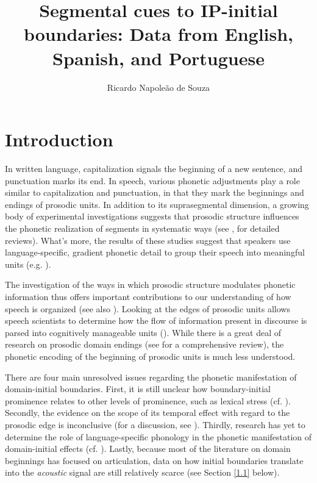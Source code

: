 \documentclass[output=paper]{langscibook}
\author{Ricardo {Napoleão de Souza}\orcid{0000-0003-2541-8326}\affiliation{University of Edinburgh}}
\title[Segmental cues to IP-initial boundaries]
{Segmental cues to IP-initial boundaries: Data from English, Spanish, and Portuguese}
\begin{document}
\maketitle

\section{Introduction}\label{Intro}
In written language, capitalization signals the beginning of a new sentence, and punctuation marks its end. In speech, various phonetic adjustments play a role similar to capitalization and punctuation, in that they mark the beginnings and endings of prosodic units. In addition to its suprasegmental dimension, a growing body of experimental investigations suggests that prosodic structure influences the phonetic realization of segments in systematic ways (see \citealt{Fougeron2001, c15}, for detailed reviews). What’s more, the results of these studies suggest that speakers use language-specific, gradient phonetic detail to group their speech into meaningful units (e.g. \citealt{kcfh03, cm05}).

The investigation of the ways in which prosodic structure modulates phonetic information thus offers important contributions to our understanding of how speech is organized (see also \citealt{st96, f10}). Looking at the edges of prosodic units allows speech scientists to determine how the flow of information present in discourse is parsed into cognitively manageable units (\citealt{k14}). While there is a great deal of research on prosodic domain endings (see \citealt{c15a} for a comprehensive review), the phonetic encoding of the beginning of prosodic units is much less understood.

There are four main unresolved issues regarding the phonetic manifestation of domain-initial boundaries. First, it is still unclear how boundary-initial prominence relates to other levels of prominence, such as lexical stress (cf. \citealt{ts07}). Secondly, the evidence on the scope of its temporal effect with regard to the prosodic edge is inconclusive (for a discussion, see \citealt{k16}). Thirdly, research has yet to determine the role of language-specific phonology in the phonetic manifestation of domain-initial effects (cf. \citealt{c16}). Lastly, because most of the literature on domain beginnings has focused on articulation, data on how initial boundaries translate into the \textit{acoustic} signal are still relatively scarce (see Section \ref{1.1} below).
\end{document}
